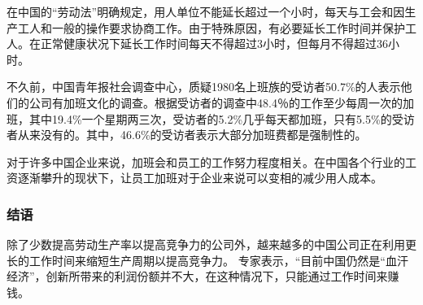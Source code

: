 在中国的“劳动法”明确规定，用人单位不能延长超过一个小时，每天与工会和因生产工人和一般的操作要求协商工作。由于特殊原因，有必要延长工作时间并保护工人。在正常健康状况下延长工作时间每天不得超过3小时，但每月不得超过36小时。

不久前，中国青年报社会调查中心，质疑1980名上班族的受访者50.7\%的人表示他们的公司有加班文化的调查。根据受访者的调查中48.4％的工作至少每周一次的加班，其中19.4\%一个星期两三次，受访者的5.2\%几乎每天都加班，只有5.5\%的受访者从来没有的。其中，46.6\%的受访者表示大部分加班费都是强制性的。

对于许多中国企业来说，加班会和员工的工作努力程度相关。在中国各个行业的工资逐渐攀升的现状下，让员工加班对于企业来说可以变相的减少用人成本。

\subsubsection{结语}
除了少数提高劳动生产率以提高竞争力的公司外，越来越多的中国公司正在利用更长的工作时间来缩短生产周期以提高竞争力。 专家表示，“目前中国仍然是“血汗经济”，创新所带来的利润份额并不大，在这种情况下，只能通过工作时间来赚钱。